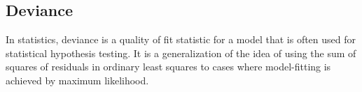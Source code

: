 \newpage
\subsection{Deviance}
In statistics, deviance is a quality of fit statistic for a model that is often used for statistical hypothesis testing. It is a generalization of the idea of using the sum of squares of residuals in ordinary least squares to cases where model-fitting is achieved by maximum likelihood.





